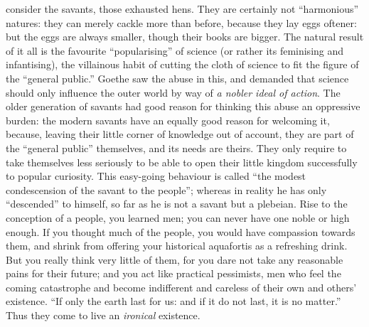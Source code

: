 consider the savants, those exhausted hens. They are certainly not
\enquote{harmonious} natures: they can merely cackle more than before,
because they lay eggs oftener: but the eggs are always smaller,
though their books are bigger. The natural result of it all is the
favourite \enquote{popularising} of science (or rather its feminising and
infantising), the villainous habit of cutting the cloth of science to
fit the figure of the \enquote{general public.} Goethe saw the abuse in this,
and demanded that science should only influence the outer world by
way of \textit{a nobler ideal of action}. The older generation of savants
had good reason for thinking this abuse an oppressive burden: the
modern savants have an equally good reason for welcoming it, because,
leaving their little corner of knowledge out of account, they are
part of the \enquote{general public} themselves, and its needs are theirs.
They only require to take themselves less seriously to be able to
open their little kingdom successfully to popular curiosity. This
easy-going behaviour is called \enquote{the modest condescension of the
savant to the people}; whereas in reality he has only \enquote{descended} to
himself, so far as he is not a savant but a plebeian. Rise to the
conception of a people, you learned men; you can never have one noble
or high enough. If you thought much of the people, you would have
compassion towards them, and shrink from offering your historical
aquafortis as a refreshing drink. But you really think very little of
them, for you dare not take any reasonable pains for their future;
and you act like practical pessimists, men who feel the coming
catastrophe and become indifferent and careless of their own and
others' existence. \enquote{If only the earth last for us: and if it do not
last, it is no matter.} Thus they come to live an \textit{ironical}
existence.
